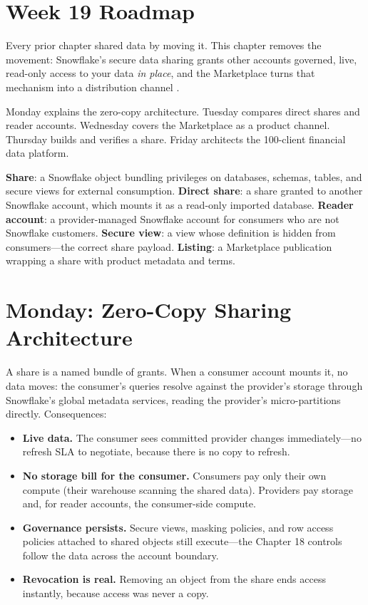 \section{Week 19 Roadmap}
Every prior chapter shared data by moving it. This chapter removes the movement: Snowflake's secure data sharing grants other accounts governed, live, read-only access to your data \emph{in place}, and the Marketplace turns that mechanism into a distribution channel \cite{snowflakeDataSharingDocs}.

Monday explains the zero-copy architecture. Tuesday compares direct shares and reader accounts. Wednesday covers the Marketplace as a product channel. Thursday builds and verifies a share. Friday architects the 100-client financial data platform.

\begin{keyterms}
\textbf{Share}: a Snowflake object bundling privileges on databases, schemas, tables, and secure views for external consumption.\quad
\textbf{Direct share}: a share granted to another Snowflake account, which mounts it as a read-only imported database.\quad
\textbf{Reader account}: a provider-managed Snowflake account for consumers who are not Snowflake customers.\quad
\textbf{Secure view}: a view whose definition is hidden from consumers---the correct share payload.\quad
\textbf{Listing}: a Marketplace publication wrapping a share with product metadata and terms.
\end{keyterms}

\section{Monday: Zero-Copy Sharing Architecture}
A share is a named bundle of grants. When a consumer account mounts it, no data moves: the consumer's queries resolve against the provider's storage through Snowflake's global metadata services, reading the provider's micro-partitions directly. Consequences:

\begin{itemize}
    \item \textbf{Live data.} The consumer sees committed provider changes immediately---no refresh SLA to negotiate, because there is no copy to refresh.
    \item \textbf{No storage bill for the consumer.} Consumers pay only their own compute (their warehouse scanning the shared data). Providers pay storage and, for reader accounts, the consumer-side compute.
    \item \textbf{Governance persists.} Secure views, masking policies, and row access policies attached to shared objects still execute---the Chapter 18 controls follow the data across the account boundary.
    \item \textbf{Revocation is real.} Removing an object from the share ends access instantly, because access was never a copy.
\end{itemize}

